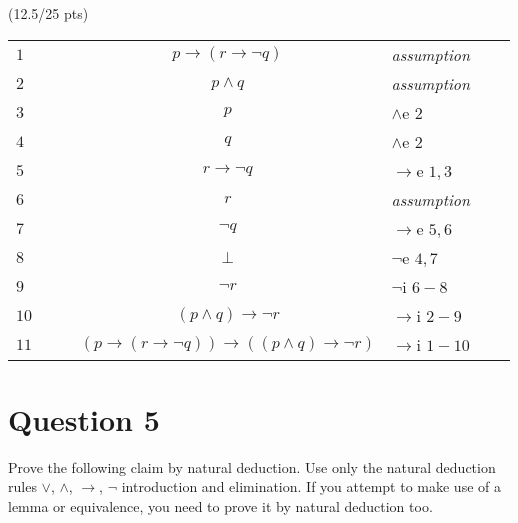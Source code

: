 \documentclass[a4paper,12pt]{article}
\newcommand\tab[1][1cm]{\hspace*{#1}}
\begin{document}
	\hfill \small{(12.5/25 pts)}\\
	\begin{tcolorbox}
		\begin{table}[H]
			\centering
			\begin{tabular}{lllclll}
				\hline 
				\hline
				\cline{2-7}
				$1$ &\multicolumn{1}{|c}{}& & $p \rightarrow (r\rightarrow\neg q)$ & \textit{assumption} & &\multicolumn{1}{l|}{}\\ 
				\cline{3-6}
				$2$ &\multicolumn{1}{|c}{}&\multicolumn{1}{|c}{}& $p \land q$ & \textit{assumption} &\multicolumn{1}{l|}{}&\multicolumn{1}{l|}{}\\
				$3$ &\multicolumn{1}{|c}{}&\multicolumn{1}{|c}{}& $p$ & $\land$e $2$ &\multicolumn{1}{l|}{}&\multicolumn{1}{l|}{}\\
				$4$ &\multicolumn{1}{|c}{}&\multicolumn{1}{|c}{}& $q$ & $\land$e $2$ &\multicolumn{1}{l|}{}&\multicolumn{1}{l|}{}\\
				$5$ &\multicolumn{1}{|c}{}&\multicolumn{1}{|c}{}& $r\rightarrow\neg q$ & $\rightarrow$e $1,3$ &\multicolumn{1}{l|}{}&\multicolumn{1}{l|}{}\\ \cline{4-5} 
				$6$ &\multicolumn{1}{|c}{}&\multicolumn{1}{|c}{}&\multicolumn{1}{|c}{$r$}&\multicolumn{1}{l|}{\textit{assumption}}&\multicolumn{1}{l|}{}&\multicolumn{1}{l|}{}\\
				$7$ &\multicolumn{1}{|c}{}&\multicolumn{1}{|c}{}&\multicolumn{1}{|c}{$\neg q$}&\multicolumn{1}{l|}{$\rightarrow$e $5,6$}&\multicolumn{1}{l|}{}&\multicolumn{1}{l|}{}\\
				$8$ &\multicolumn{1}{|c}{}&\multicolumn{1}{|c}{}&\multicolumn{1}{|c}{$\bot$}&\multicolumn{1}{l|}{$\neg$e $4,7$}&\multicolumn{1}{l|}{}&\multicolumn{1}{l|}{}\\ \cline{4-5} 
				$9$ &\multicolumn{1}{|c}{}&\multicolumn{1}{|c}{}& $\neg r$ & $\neg$i $6-8$ &\multicolumn{1}{l|}{}&\multicolumn{1}{l|}{}\\ \cline{3-6}
				$10$ &\multicolumn{1}{|c}{}& & $(p\land q)\rightarrow\neg r$ & $\rightarrow$i $2-9$ & &\multicolumn{1}{l|}{}\\ \cline{2-7}
				$11$ & & & $(p\rightarrow(r\rightarrow\neg q))\rightarrow((p\land q)\rightarrow\neg r)$ & $\rightarrow$i $1-10$ & & \\
			\end{tabular}
		\end{table}
	\end{tcolorbox}
	
	\section*{Question 5 \hfill {}}
	\tab Prove the following claim by natural deduction. Use only the natural deduction rules $\vee$, $\wedge$, $\rightarrow$, $\neg$ introduction and elimination. If you attempt to make use of a lemma or equivalence, you need to prove it by natural deduction too.
	
\end{document}
